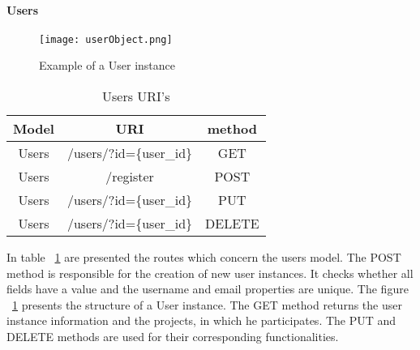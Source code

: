 \paragraph{Users}
\begin{figure}
	\centerline{\texttt{[image: userObject.png]}}
	\caption{Example of a User instance}
	\label{userObject}
\end{figure}
\begin{table}[]
\centering
\begin{tabular}{|c|c|c|}
\hline
\rowcolor[HTML]{32CB00} 
\textbf{Model} & \textbf{URI}                                                     & \textbf{method}                                     \\ \hline
\rowcolor[HTML]{FFFFFF} 
Users          & /users/?id=\{user\_id\}                                              & GET                                                 \\ \hline
\rowcolor[HTML]{67FD9A} 
Users          & /register                                                        & POST                                                \\ \hline
\rowcolor[HTML]{FFFFFF} 
Users          & /users/?id=\{user\_id\}                                              & PUT                                                 \\ \hline
\rowcolor[HTML]{67FD9A} 
Users          & \multicolumn{1}{l|}{\cellcolor[HTML]{67FD9A}/users/?id=\{user\_id\}} & \multicolumn{1}{l|}{\cellcolor[HTML]{67FD9A}DELETE} \\ \hline
\end{tabular}
\caption{Users URI's}
\label{usersURI}
\end{table}
In table ~\ref{usersURI} are presented the routes which concern the users model. The POST method is responsible for the creation of new user instances. It checks whether all fields have a value and the username and email properties are unique. The figure ~\ref{userObject} presents the structure of a User instance. The GET method returns the user instance information and the projects, in which he participates. The PUT and DELETE methods are used for their corresponding functionalities.


